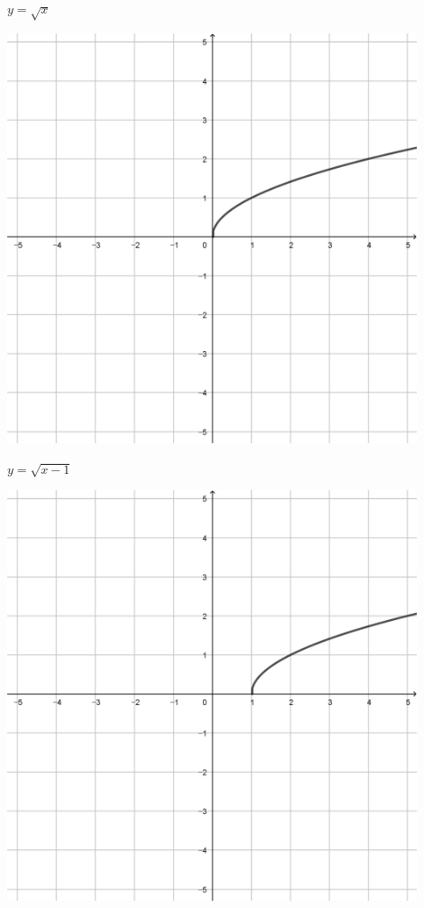 \documentclass[a4paper]{oblivoir}
\begin{document}
\clearpage
\begin{minipage}{0.45\textwidth}\centering
\(y=\sqrt x\)
\par\bigskip\includegraphics[width=0.9\textwidth]{img/23-1}
\end{minipage}
\begin{minipage}{0.45\textwidth}\centering
\(y=\sqrt{x-1}\)
\par\bigskip\includegraphics[width=0.9\textwidth]{img/23-2}
\end{minipage}\bigskip\bigskip\par
\end{document}

